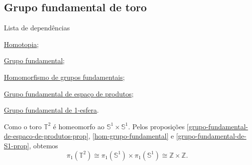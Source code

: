 \subsection{Grupo fundamental de toro}
\label{grupo-fundamental-de-toro-ex}
\begin{titlemize}{Lista de dependências}
    \item \hyperref[homotopia-def]{Homotopia};\\
    \item \hyperref[grupo-fundamental]{Grupo fundamental};\\
    \item \hyperref[hom-grupo-fundamental]{Homomorfismo de grupos fundamentais};\\
    \item \hyperref[grupo-fundamental-de-espaco-de-produtos-prop]{Grupo fundamental de espaço de produtos};\\
    \item \hyperref[grupo-fundamental-de-S1-prop]{Grupo fundamental de 1-esfera}.
    
\end{titlemize}

\begin{ex}
    Como o toro $\mathbb{T}^2$ é homeomorfo ao $\mathbb{S}^1\times\mathbb{S}^1$. Pelos proposições \ref{grupo-fundamental-de-espaco-de-produtos-prop}, \ref{hom-grupo-fundamental} e \ref{grupo-fundamental-de-S1-prop}, obtemos 
    \[\pi_1(\mathbb{T}^2)\cong \pi_1(\mathbb{S}^1)\times\pi_1(\mathbb{S}^1)\cong\mathbb{Z}\times\mathbb{Z}.\]
\end{ex}
